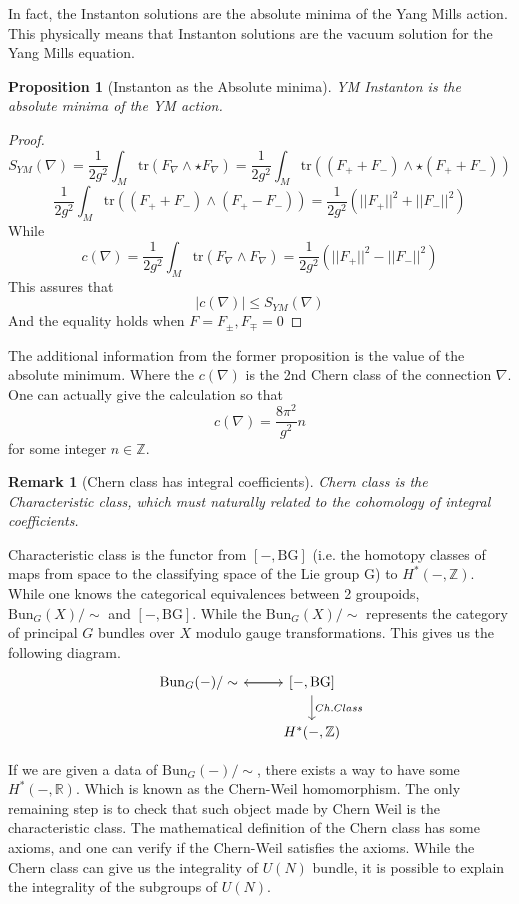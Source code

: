 \documentclass{article}
\newtheorem{prop}{Proposition}
\newtheorem{rem}{Remark}
\begin{document}
In fact, the Instanton solutions are the absolute minima of the Yang Mills action. This physically means that Instanton solutions are the vacuum solution for the Yang Mills equation. 
\begin{prop}[Instanton as the Absolute minima]
    YM Instanton is the absolute minima of the YM action.
\end{prop}
\begin{proof}
    \[
        S_{YM}(\nabla) = \frac{1}{2g^2}\int_M \mathrm{tr}(F_\nabla\wedge \star F_\nabla) = \frac{1}{2g^2}\int_M \mathrm{tr}((F_+ + F_-)\wedge \star (F_+ + F_-))
    \]
    \[
        \frac{1}{2g^2}\int_M \mathrm{tr}((F_+ + F_-)\wedge (F_+ - F_-)) = \frac{1}{2g^2}\left(||F_+||^2 + ||F_-||^2 \right)
    \]
    While 
    \[
        c(\nabla) = \frac{1}{2g^2}\int_M \mathrm{tr}(F_\nabla\wedge F_\nabla) = \frac{1}{2g^2}\left(||F_+||^2 - ||F_-||^2 \right)
    \]
    This assures that
    \[
        |c(\nabla)| \leq S_{YM}(\nabla)
    \]
    And the equality holds when $F=F_{\pm}, F_{\mp}=0$
\end{proof}

The additional information from the former proposition is the value of the absolute minimum. Where the $c(\nabla)$ is the 2nd Chern class of the connection $\nabla$. One can actually give the calculation so that
\[
    c(\nabla) = \frac{8\pi^2}{g^2} n
\]
for some integer $n\in\mathbb{Z}$.

\begin{rem}[Chern class has integral coefficients]
    Chern class is the Characteristic class, which must naturally related to the cohomology of integral coefficients. 
\end{rem}
Characteristic class is the functor from $[-,\mathrm{BG}]$ (i.e. the homotopy classes of maps from space to the classifying space of the Lie group G) to $H^*(-,\mathbb{Z})$. While one knows the categorical equivalences between 2 groupoids, $\mathrm{Bun}_G(X)/\sim$ and $[-,\mathrm{BG}]$. While the $\mathrm{Bun}_G(X)/\sim$ represents the category of principal $G$ bundles over $X$ modulo gauge transformations. This gives us the following diagram.
\[
\begin{tikzcd}
   \mathrm{Bun}_G(-)/\sim \arrow[r] 
    & {[-,\mathrm{BG}]}\arrow[l] \arrow[d, "Ch.Class"] \\
     & {H^*(-,\mathbb{Z})}
\end{tikzcd}
\]

If we are given a data of $\mathrm{Bun}_G(-)/\sim$, there exists a way to have some $H^*(-,\mathbb{R})$. Which is known as the Chern-Weil homomorphism. The only remaining step is to check that such object made by Chern Weil is the characteristic class. The mathematical definition of the Chern class has some axioms, and one can verify if the Chern-Weil satisfies the axioms. While the Chern class can give us the integrality of $U(N)$ bundle, it is possible to explain the integrality of the subgroups of $U(N)$. 
\end{document}

